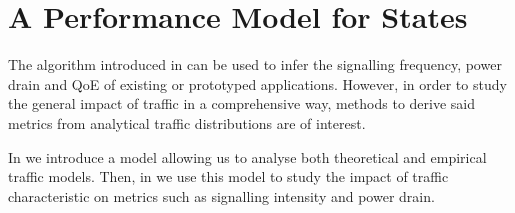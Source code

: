 \section{A Performance Model for   States}\label{sec:network:performance_model}
The algorithm introduced in  can be used to infer the signalling frequency, power drain and \gls{QoE} of existing or prototyped applications.
However, in order to study the general impact of traffic in a comprehensive way, methods to derive said metrics from analytical traffic distributions are of interest.

In  we introduce a model allowing us to 
analyse both theoretical and empirical traffic models.
Then, in  we use this model to study the impact of traffic characteristic on metrics such as signalling intensity and power drain.



